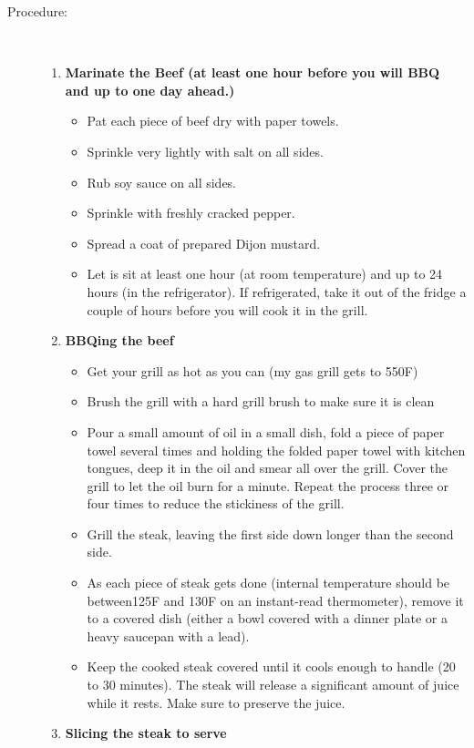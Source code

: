 \documentclass[11pt,letterpaper]{article}
\begin{document}
\begin{description}
\item[Procedure:]\ \\
	\begin{enumerate}
	\item {\bf Marinate the Beef (at least one hour before you will BBQ and up to one day ahead.)}
	\begin{itemize}
	\item  Pat each piece of beef dry with paper towels. 
	\item Sprinkle very lightly with salt on all sides.
	\item Rub soy sauce on all sides. 
	\item Sprinkle with freshly cracked pepper. 
	\item Spread a coat of prepared Dijon mustard.
	\item Let is sit at least one hour (at room temperature) and up to 24 hours (in the refrigerator). If refrigerated, take it out of the fridge a couple of hours before you will cook it in the grill.
	\end{itemize}
	\item {\bf BBQing the beef}
	\begin{itemize}
	\item Get your grill as hot as you can (my gas grill gets to 550F)
	 \item Brush the grill with a hard grill brush to make sure it is clean
	 \item Pour a small amount of oil in a small dish, fold a piece of paper towel several times and holding the folded paper towel with kitchen tongues, deep it in the oil and smear all over the grill. Cover the grill to let the oil burn for a minute. Repeat the process three or four times to reduce the stickiness of the grill. 
	 \item Grill the steak, leaving the first side down longer than the second side.
	 \item As each piece of steak gets done (internal temperature should be between125F and 130F on an instant-read thermometer), remove it to a covered dish (either a bowl covered with a dinner plate or a heavy saucepan with a lead).
	 \item Keep the cooked steak covered until it cools enough to handle (20 to 30 minutes). The steak will release a significant amount of juice while it rests. Make sure to preserve the juice.
	\end{itemize}
	\item {\bf Slicing the steak to serve}
	\begin{itemize}

\end{itemize}
\end{enumerate}
\end{description}
\end{document}
